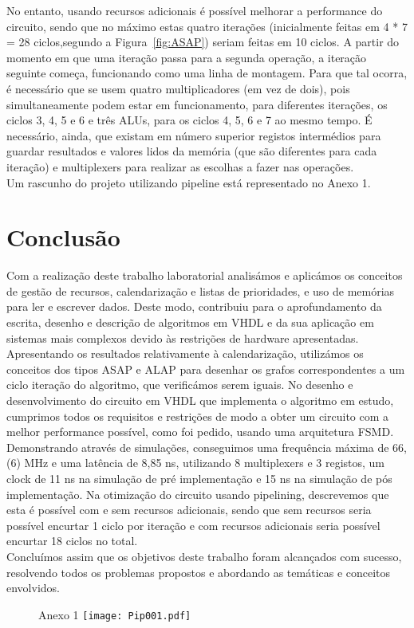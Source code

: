 \documentclass{article} %
\begin{document}
		\noindent No entanto, usando recursos adicionais é possível melhorar a performance do circuito, sendo que no máximo estas quatro iterações (inicialmente feitas em 4 * 7 = 28 ciclos,segundo a Figura~\ref{fig:ASAP}) seriam feitas em 10 ciclos. A partir do momento em que uma iteração passa para a segunda operação, a iteração seguinte começa, funcionando como uma linha de montagem. Para que tal ocorra, é necessário que se usem quatro multiplicadores (em vez de dois), pois simultaneamente podem estar em funcionamento, para diferentes iterações, os ciclos 3, 4, 5 e 6 e três ALUs, para os ciclos 4, 5, 6 e 7 ao mesmo tempo. É necessário, ainda, que existam em número superior registos intermédios para guardar resultados e valores lidos da memória (que são diferentes para cada iteração) e multiplexers para realizar as escolhas a fazer nas operações.\\

		\noindent Um rascunho do projeto utilizando pipeline está representado no Anexo 1.

	\section{Conclusão}

		Com a realização deste trabalho laboratorial analisámos e aplicámos os conceitos de gestão de recursos, calendarização e listas de prioridades, e uso de memórias para ler e escrever dados. Deste modo, contribuiu para o aprofundamento da escrita, desenho e descrição de algoritmos em VHDL e da sua aplicação em sistemas mais complexos devido às restrições de hardware apresentadas.\\

		\noindent Apresentando os resultados relativamente à calendarização, utilizámos os conceitos dos tipos ASAP e ALAP para desenhar os grafos correspondentes a um ciclo iteração do algoritmo, que verificámos serem iguais. No desenho e desenvolvimento do circuito em VHDL que implementa o algoritmo em estudo, cumprimos todos os requisitos e restrições de modo a obter um circuito com a melhor performance possível, como foi pedido, usando uma arquitetura FSMD. Demonstrando através de simulações, conseguimos uma frequência máxima de 66,(6) MHz e uma latência de 8,85 ns, utilizando  8 multiplexers e 3 registos, um clock de 11 ns na simulação de pré implementação e 15 ns na simulação de pós implementação. Na otimização do circuito usando pipelining, descrevemos que esta é possível com e sem recursos adicionais, sendo que sem recursos seria possível encurtar 1 ciclo por iteração e com recursos adicionais seria possível encurtar 18 ciclos no total.\\

		\noindent Concluímos assim que os objetivos deste trabalho foram alcançados com sucesso, resolvendo todos os problemas propostos e abordando as temáticas e conceitos envolvidos.
	\clearpage


	\begin{figure}[htbp]
			\begin{center}
				Anexo 1
				\texttt{[image: Pip001.pdf]}
			\end{center}
		\end{figure}

	
\end{document}
